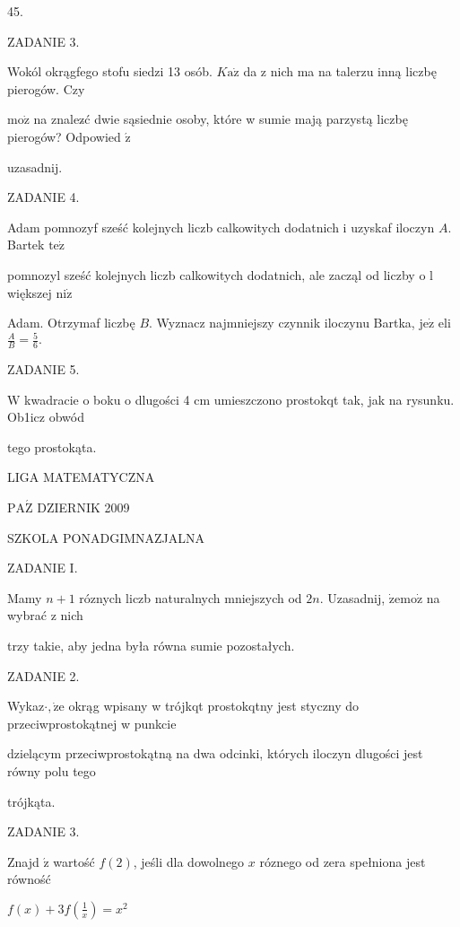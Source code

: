 \documentclass[a4paper,12pt]{article}
\begin{document}
45.

ZADANIE 3.

Wokól okrągfego stofu siedzi 13 osób. $K\mathrm{a}\dot{\mathrm{z}}$ da z nich ma na talerzu inną liczbę pierogów. Czy

$\mathrm{m}\mathrm{o}\dot{\mathrm{z}}$ na znalez$\acute{}$ć dwie sąsiednie osoby, które w sumie mają parzystą liczbę pierogów? Odpowied $\acute{\mathrm{z}}$

uzasadnij.

ZADANIE 4.

Adam pomnozyf sześć kolejnych liczb calkowitych dodatnich i uzyskaf iloczyn $A$. Bartek $\mathrm{t}\mathrm{e}\dot{\mathrm{z}}$

pomnozyl sześć kolejnych liczb calkowitych dodatnich, ale zacząl od liczby o l większej $\mathrm{n}\mathrm{i}\dot{\mathrm{z}}$

Adam. Otrzymaf liczbę $B$. Wyznacz najmniejszy czynnik iloczynu Bartka, $\mathrm{j}\mathrm{e}\dot{\mathrm{z}}$ eli $\displaystyle \frac{A}{B}=\frac{5}{6}.$

ZADANIE 5.

$\mathrm{W}$ kwadracie o boku o dlugości 4 cm umieszczono prostokqt tak, jak na rysunku. Ob1icz obwód

tego prostokąta.






LIGA MATEMATYCZNA

$\mathrm{P}\mathrm{A}\acute{\mathrm{Z}}$ DZIERNIK 2009

SZKOLA PONADGIMNAZJALNA

ZADANIE I.

Mamy $n+1$ róznych liczb naturalnych mniejszych od $2n$. Uzasadnij, $\dot{\mathrm{z}}\mathrm{e}\mathrm{m}\mathrm{o}\dot{\mathrm{z}}$ na wybrać z nich

trzy takie, aby jedna była równa sumie pozostałych.

ZADANIE 2.

Wykaz$\cdot, \dot{\mathrm{z}}\mathrm{e}$ okrąg wpisany w trójkqt prostokqtny jest styczny do przeciwprostokątnej w punkcie

dzielącym przeciwprostokątną na dwa odcinki, których iloczyn dlugości jest równy polu tego

trójkąta.

ZADANIE 3.

Znajd $\acute{\mathrm{z}}$ wartość $f(2)$, jeśli dla dowolnego $x$ róznego od zera spełniona jest równość

$f(x)+3f(\displaystyle \frac{1}{x})=x^{2}$
\end{document}
